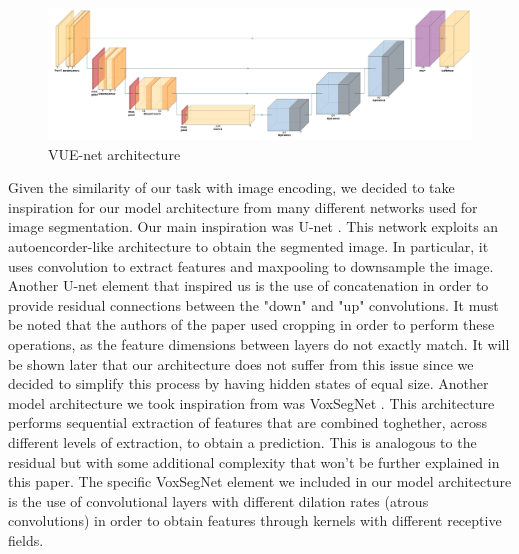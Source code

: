 \begin{figure}[ht]
  \centering
  \includegraphics[width=\textwidth]{images/VUE_net_model.png}
  \caption{VUE-net architecture}
  \label{fig:model}
\end{figure}

Given the similarity of our task with image encoding, we decided to take inspiration for our model architecture
from many different networks used for image segmentation. Our main inspiration was U-net \cite{Unet}.
This network exploits an autoencorder-like architecture to obtain the segmented image.
In particular, it uses convolution to extract features and maxpooling to downsample the image.
Another U-net element that inspired us is the use of concatenation in order to provide
residual connections between the "down" and "up" convolutions. It must be noted that
the authors of the paper used cropping in order to perform these operations, as the feature dimensions between layers do not exactly match. 
It will be shown later that our architecture does not suffer from this issue since we decided to simplify 
this process by having hidden states of equal size.
Another model architecture we took inspiration from was VoxSegNet \cite{VoxSegNet}. This architecture performs 
sequential extraction of features that are combined toghether, across different levels of extraction, to obtain a prediction. 
This is analogous to the residual but with some additional complexity that won't be
further explained in this paper. 
The specific VoxSegNet element we included in our model architecture is the use of convolutional layers with different dilation rates 
(atrous convolutions) in order to obtain features through kernels with different receptive fields.

